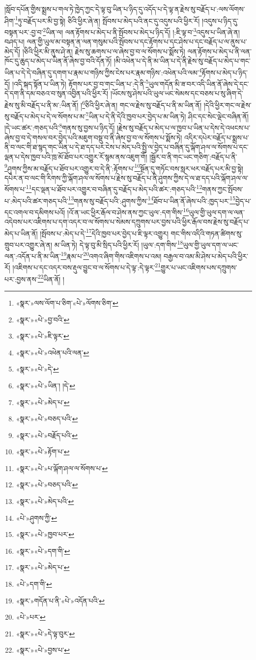 །སློབ་དཔོན་གྱིས་སྨྲས་པ་གལ་ཏེ་ཁྱེད་ཀྱང་དེ་ལྟ་བུ་ཡིན་པ་ཉིད་དུ་འདོད་པ་དེ་ལྟ་ན་རྗེས་སུ་བརྗོད་པ་:ལས་ལོགས་ཤིག་\footnote{«སྣར་»ལས་ལོག་པ་ཅིག་«པེ་»ལོགས་ཅིག་}ཏུ་བརྗོད་པར་མི་བྱ་སྟེ། ཅིའི་ཕྱིར་ཞེ་ན། སྤོབས་པ་མེད་པའི་ནང་དུ་འདུས་པའི་ཕྱིར་རོ། །འདུས་པ་ཉིད་དུ་བསྟན་པར་:བྱ་བ་\footnote{«སྣར་»«པེ་»བྱ་བའི་}ཡིན་ལ། ལན་རྟོགས་པ་མེད་པ་ནི་སྤོབས་པ་མེད་པ་ཉིད་དོ། །:ཇི་ལྟ་བ་\footnote{«སྣར་»«པེ་»ཇི་ལྟར་}འདུས་པ་ཡིན་ཞེ་ན། བཤད་པ། ལན་གྱི་ཡུལ་མ་བསྟན་ན་ལན་གསུམ་པའི་སྤོབས་པ་དང་རྟོགས་པ་དང་ཤེས་པ་དང་བརྗོད་པ་ལ་ནུས་པ་མེད་དོ། །ཅིའི་ཕྱིར་མི་ནུས་ཤེ་ན། རྗེས་སུ་ཆགས་པ་ལ་ཞེས་བྱ་བ་ལ་སོགས་པ་སྨོས་ཏེ། ལན་རྟོགས་པ་མེད་པ་ནི་ལན་ཁོང་དུ་ཆུད་པ་མེད་པ་ཡིན་ནོ་ཞེས་བྱ་བའི་དོན་ཏོ། །མི་འཕེན་པ་དེ་ནི་མ་ཡིན་པ་དེ་ནི་རྗེས་སུ་བརྗོད་པ་མེད་པ་གང་ཡིན་པ་དེ་དེ་བཞིན་དུ་དགག་པ་རྣམ་པ་གཉིས་ཀྱིས་ངེས་པར་རྣམ་གཉིས་:འཕེན་པའི་ལམ་\footnote{«སྣར་»«པེ་»འཕེན་པའི་ལན་}རྟོགས་པ་མེད་པ་ཉིད་དོ། །འདི་སྐད་སྟོན་པ་ཡིན་ཏེ། རྟོགས་པར་བྱ་བ་གང་ཡིན་པ་:དེ་ནི་\footnote{«སྣར་»«པེ་»དེ་}ཡུལ་གདོན་མི་ཟ་བར་འདི་ཡིན་ནོ་ཞེས་དེ་དང་དེ་དག་ནི་དམ་བཅའ་བ་སུན་འབྱིན་པའི་ཕྱིར་རོ། །ཡོངས་སུ་ཤེས་པའི་ཡུལ་ཡང་སེམས་དང་བཅས་པ་སུ་ཞིག་དེ་རྗེས་སུ་མི་བརྗོད་པ་ནི་མ་:ཡིན་ནོ། །\footnote{«སྣར་»«པེ་»ཡིན་། །དེ་}ཅིའི་ཕྱིར་ཞེ་ན། གང་ལ་རྗེས་སུ་བརྗོད་པ་ནི་མ་ཡིན་ནོ། །དེའི་ཕྱིར་གང་ལ་རྗེས་སུ་བརྗོད་པ་མེད་པ་དེ་ལ་སོགས་པ་མ་\footnote{«སྣར་»«པེ་»མེད་པ་}ཡིན་པ་དེ་ནི་དེའི་ཁྱབ་པར་བྱེད་པ་མ་ཡིན་ཏེ། ཤིང་དང་སེང་ལྡེང་བཞིན་ནོ། །དེ་ཡང་ཚར་:གཅད་པའི་\footnote{«སྣར་»«པེ་»བཅད་པའི་}གནས་སུ་བྱས་པ་ཉིད་དོ། །རྗེས་སུ་བརྗོད་པ་མེད་པ་ལ་ཁྱབ་པ་ཡིན་པ་དེས་དེ་འཕངས་པ་ཞེས་བྱ་བ་དེ་གསལ་བར་བྱེད་པའི་མཇུག་བསྡུ་བ་ནི་ཞེས་བྱ་བ་ལ་སོགས་པ་སྨོས་ཏེ། འདིར་དཔེར་བརྗོད་པ་སྨྲས་པ་ནི་བ་ལང་གི་ཐ་སྙད་གང་ཡིན་པ་དེ་ཐ་དད་པར་ངེས་པ་མེད་པའི་སྤྱི་ལ་བྱེད་པ་བཞིན་དུ་ལྐོག་ཤལ་ལ་སོགས་པ་དང་ལྡན་པ་དེས་ཁྱབ་པའི་ཁྲ་མོ་ཐོབ་པར་འགྱུར་རོ་སྙམ་ནས་འཇུག་གོ། །སྦྱོར་བ་ནི་གང་ཡང་གཅིག་:བརྗོད་པ་ནི་\footnote{«སྣར་»«པེ་»བརྗོད་པའི་}ཤུགས་ཀྱིས་མ་བརྗོད་པ་ཐོབ་པར་འགྱུར་བ་དེ་ནི་:རྟོགས་པ་\footnote{«སྣར་»«པེ་»རྟོག་པ་}སྔོན་དུ་གཏོང་བས་སླར་ཕར་བརྗོད་པར་མི་བྱ་སྟེ། དཔེར་ན་བ་ལང་གི་རིགས་ཀྱི་ལྐོག་ཤལ་ལ་སོགས་པ་རྗེས་སུ་བརྗོད་པ་ནི་ཤུགས་ཀྱིས་དེ་ལ་ཐ་དད་པའི་ལྐོག་ཤལ་ལ་སོགས་པ་\footnote{«སྣར་»«པེ་»པ་ལྐོག་ཤལ་ལ་སོགས་པ་}དང་ལྡན་པ་ཐོབ་པར་འགྱུར་བ་བཞིན་དུ་བརྗོད་པ་མེད་པའི་ཚར་:གཅད་པའི་\footnote{«སྣར་»«པེ་»བཅད་པའི་}གནས་ཀྱང་སྤོབས་པ་:མེད་པའི་ཚར་གཅད་པའི་\footnote{«སྣར་»«པེ་»མེད་པའི་}གནས་སུ་བརྗོད་པའི་:ཤུགས་ཀྱིས་\footnote{«པེ་»ཤུགས་ཀྱི་}ཐོབ་པ་ཡིན་ནོ་ཞེས་པའི་:ཁྱད་པར་\footnote{«སྣར་»«པེ་»ཁྱབ་པར་}བྱེད་པ་དང་འགལ་བ་དམིགས་པའོ། །འོ་ན་ཡང་ཕྱིར་རྒོལ་བ་ཤེས་ནས་ཀྱང་ཡུལ་:དག་གིས་\footnote{«སྣར་»«པེ་»དག་གི་}ཡུལ་གྱི་ཡུལ་དག་ལ་ལན་འདེབས་པར་འཇིགས་པ་དག་འདར་བ་ལ་སོགས་པ་སེམས་དཀྲུགས་པར་བྱས་པའི་ཕྱིར་རྒོལ་བས་རྗེས་སུ་བརྗོད་པ་མེད་པ་ཡིན་ནོ། །སྤོབས་པ་:མེད་པ་དེ་\footnote{«སྣར་»«པེ་»མེད་པ་}དེའི་ཁྱབ་པར་བྱེད་པ་ཇི་ལྟར་འགྱུར། གང་གིས་འདིའི་གཏན་ཚིགས་སུ་གྲུབ་པར་འགྱུར་ཞེ་ན། མ་ཡིན་ཏེ། དེ་ལྟ་བུ་མི་སྲིད་པའི་ཕྱིར་རོ། །ཡུལ་:དག་གིས་\footnote{«པེ་»དག་གི་}ཡུལ་གྱི་ཡུལ་དག་ལ་ཡང་ལན་:འདོན་པ་ནི་མ་ཡིན་\footnote{«སྣར་»གདོན་པ་ནི་«པེ་»འདོན་པའི་}རྣམ་པ་\footnote{«པེ་»པར་}འགའ་ཞིག་གིས་འཇིགས་པ་འམ། བརྒྱལ་བ་འམ་མི་ཤེས་པ་མེད་པའི་ཕྱིར་རོ། །འཇིགས་པ་དང་འདར་བས་རྡུལ་བྱུང་བ་ལ་སོགས་པ་དེ་ལྟ་:དེ་ལྟར་\footnote{«སྣར་»«པེ་»དེ་ལྟ་བུར་}གྱུར་པ་ཡང་འཇིགས་པས་དཀྲུགས་པར་:བྱས་ནས་\footnote{«སྣར་»«པེ་»བྱས་པ་}ཡིན་ནོ། །
